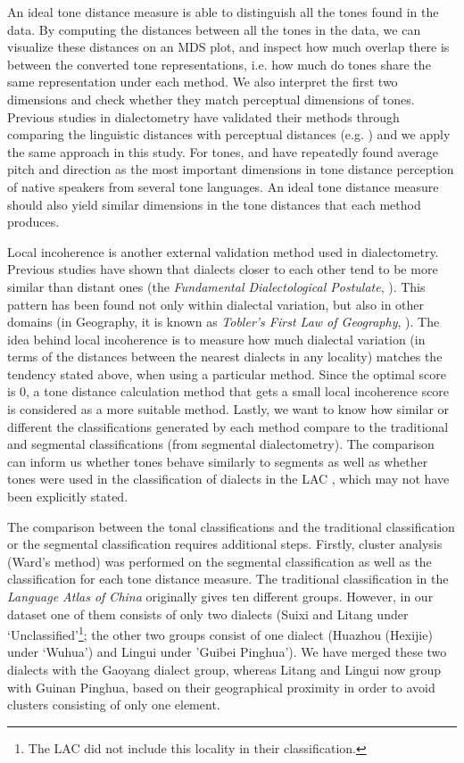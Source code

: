 \documentclass[output=paper, chinesefont]{langscibook}
\begin{document}
An ideal tone distance measure is able to distinguish all the tones found in the data. By computing the distances between all the tones in the data, we can visualize these distances on an MDS plot, and inspect how much overlap there is between the converted tone representations, i.e. how much do tones share the same representation under each method.  We also interpret the first two dimensions and check whether they match  perceptual dimensions of tones. Previous studies in dialectometry have validated their methods through comparing the linguistic distances with perceptual distances (e.g. \citealt{GooskensHeeringa2004}) and we apply the same approach in this study. For tones, \citet{GandourHarshman1978} and \citet{Gandour1983} have repeatedly found average pitch and direction as the most important dimensions in tone distance perception of native speakers from several tone languages. An ideal tone distance measure should also yield similar dimensions in the tone distances that each method produces.

Local incoherence is another external validation method used in dialectometry. Previous studies have shown that dialects closer to each other tend to be more similar than distant ones (the \textit{Fundamental Dialectological Postulate}, \citealt{NerbonneKleiweg2007}). This pattern has been found not only within dialectal variation, but also in other domains (in Geography, it is known as \textit{Tobler’s First Law of Geography}, \citealt{Tobler1970}). The idea behind local incoherence is to measure how much dialectal variation (in terms of the distances between the nearest dialects in any locality) matches the tendency stated above, when using a particular method. Since the optimal score is 0, a tone distance calculation method that gets a small local incoherence score is considered as a more suitable method.
\largerpage
Lastly, we want to know how similar or different the classifications generated by each method compare to the traditional and segmental classifications (from segmental dialectometry). The comparison can inform us whether tones behave similarly to segments as well as whether tones were used in the classification of dialects in the LAC \citep{CASS2012}, which may not have been explicitly stated. 

The comparison between the tonal classifications and the traditional classification or the segmental classification requires additional steps. Firstly, cluster analysis (Ward’s method) was performed on the segmental classification as well as the classification for each tone distance measure. The traditional classification in the \textit{Language Atlas of China} originally gives ten different groups. However, in our dataset one of them consists of only two dialects (Suixi and Litang under ‘Unclassified'\footnote{The LAC did not include this locality in their classification.}; the other two groups consist of one dialect (Huazhou (Hexijie) under ‘Wuhua’) and Lingui under 'Guibei Pinghua'). We have merged these two dialects with the Gaoyang dialect group, whereas Litang and Lingui now group with Guinan Pinghua, based on their geographical proximity in order to avoid clusters consisting of only one element.
\end{document}

